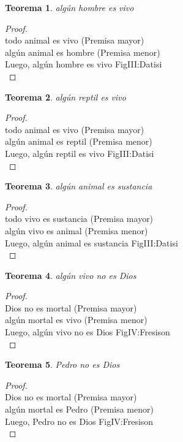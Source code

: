 ﻿\documentclass[12pt]{book}
\newtheorem{theorem}{Teorema}[chapter]
\newtheorem{proof}{Demostración}
\begin{document}
\begin{theorem}
algún hombre es vivo
\label{th: 101}
\end{theorem}\begin{proof}\\todo animal es vivo	 (Premisa mayor) \\algún animal es hombre	 (Premisa menor) \\Luego, algún hombre es vivo	FigIII:Datisi \\ \end{proof}
\begin{theorem}
algún reptil es vivo
\label{th: 102}
\end{theorem}\begin{proof}\\todo animal es vivo	 (Premisa mayor) \\algún animal es reptil	 (Premisa menor) \\Luego, algún reptil es vivo	FigIII:Datisi \\ \end{proof}
\begin{theorem}
algún animal es sustancia
\label{th: 103}
\end{theorem}\begin{proof}\\todo vivo es sustancia	 (Premisa mayor) \\algún vivo es animal	 (Premisa menor) \\Luego, algún animal es sustancia	FigIII:Datisi \\ \end{proof}
\begin{theorem}
algún vivo no es Dios
\label{th: 104}
\end{theorem}\begin{proof}\\Dios no es mortal	 (Premisa mayor) \\algún mortal es vivo	 (Premisa menor) \\Luego, algún vivo no es Dios	FigIV:Fresison \\ \end{proof}
\begin{theorem}
Pedro no es Dios
\label{th: 105}
\end{theorem}\begin{proof}\\Dios no es mortal	 (Premisa mayor) \\algún mortal es Pedro	 (Premisa menor) \\Luego, Pedro no es Dios	FigIV:Fresison \\ \end{proof}
\end{document}
